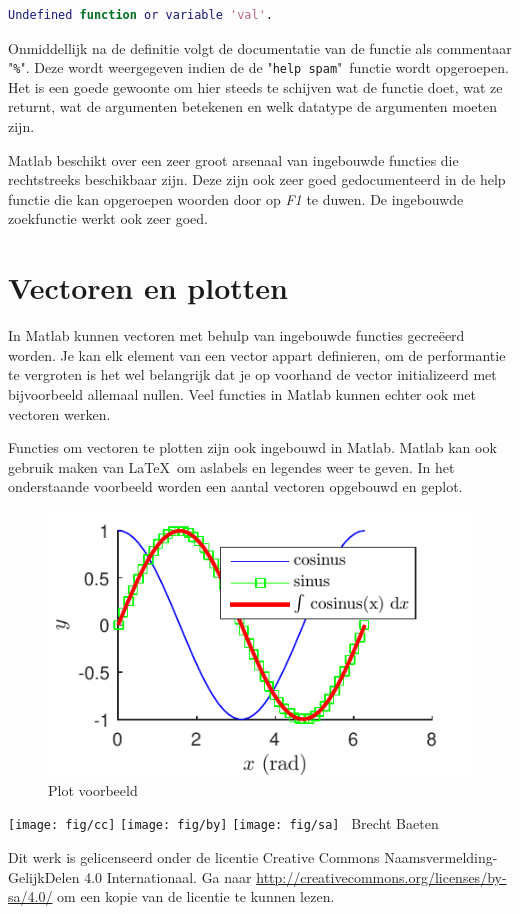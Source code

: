 \documentclass[11pt,twoside]{article}
\begin{document}
\begin{lstlisting}[language=matlab]
Undefined function or variable 'val'.
\end{lstlisting}

Onmiddellijk na de definitie volgt de documentatie van de functie als commentaar "\lstinline{%}". Deze wordt weergegeven indien de de "\lstinline{help spam}"\ functie wordt opgeroepen. Het is een goede gewoonte om hier steeds te schijven wat de functie doet, wat ze returnt, wat de argumenten betekenen en welk datatype de argumenten moeten zijn.

Matlab beschikt over een zeer groot arsenaal van ingebouwde functies die rechtstreeks beschikbaar zijn. Deze zijn ook zeer goed gedocumenteerd in de help functie die kan opgeroepen woorden door op \emph{F1} te duwen. De ingebouwde zoekfunctie werkt ook zeer goed.

	\section{Vectoren en plotten} 
In Matlab kunnen vectoren met behulp van ingebouwde functies gecreëerd worden. Je kan elk element van een vector appart definieren, om de performantie te vergroten is het wel belangrijk dat je op voorhand de vector initializeerd met bijvoorbeeld allemaal nullen. Veel functies in Matlab kunnen echter ook met vectoren werken.

Functies om vectoren te plotten zijn ook ingebouwd in Matlab. Matlab kan ook gebruik maken van \LaTeX\ om aslabels en legendes weer te geven. In het onderstaande voorbeeld worden een aantal vectoren opgebouwd en geplot.


\begin{figure}[ht]
	\centering
	\includegraphics{examples/sinus_cosinus}
	\caption{Plot voorbeeld}
	\label{fig:sinus_cosinus}
\end{figure}

\vspace{2cm}

\null
\vfill
\texttt{[image: fig/cc]}
\texttt{[image: fig/by]}
\texttt{[image: fig/sa]}
\quad \the\year\ Brecht Baeten
\vspace{0.5cm}

Dit werk is gelicenseerd onder de licentie Creative Commons Naamsvermelding-GelijkDelen 4.0 Internationaal. Ga naar \url{http://creativecommons.org/licenses/by-sa/4.0/} om een kopie van de licentie te kunnen lezen.
\vspace{1cm}
\end{document}
